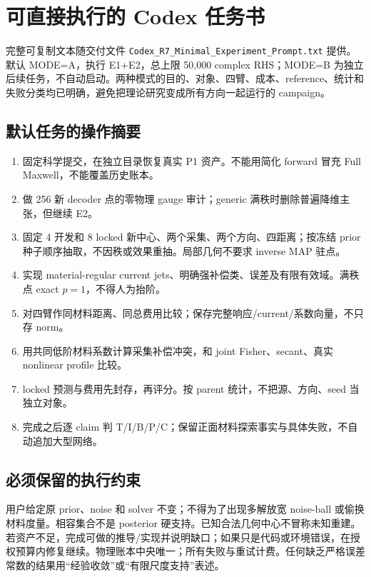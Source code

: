 \section{可直接执行的 Codex 任务书}
完整可复制文本随交付文件 \texttt{Codex\_R7\_Minimal\_Experiment\_Prompt.txt} 提供。默认 MODE=A，执行 E1+E2，总上限 50,000 complex RHS；MODE=B 为独立后续任务，不自动启动。两种模式的目的、对象、四臂、成本、reference、统计和失败分类均已明确，避免把理论研究变成所有方向一起运行的 campaign。

\subsection{默认任务的操作摘要}
\begin{enumerate}
\item 固定科学提交，在独立目录恢复真实 P1 资产。不能用简化 forward 冒充 Full Maxwell，不能覆盖历史账本。
\item 做 256 新 decoder 点的零物理 gauge 审计；generic 满秩时删除普遍降维主张，但继续 E2。
\item 固定 4 开发和 8 locked 新中心、两个采集、两个方向、四距离；按冻结 prior 种子顺序抽取，不因秩或效果重抽。局部几何不要求 inverse MAP 驻点。
\item 实现 material-regular current jets、明确强补偿类、误差及有限有效域。满秩点 exact $p=1$，不得人为抬阶。
\item 对四臂作同材料距离、同总费用比较；保存完整响应/current/系数向量，不只存 norm。
\item 用共同低阶材料系数计算采集补偿冲突，和 joint Fisher、secant、真实 nonlinear profile 比较。
\item locked 预测与费用先封存，再评分。按 parent 统计，不把源、方向、seed 当独立对象。
\item 完成之后逐 claim 判 T/I/B/P/C；保留正面材料探索事实与具体失败，不自动追加大型网络。
\end{enumerate}

\subsection{必须保留的执行约束}
用户给定原 prior、noise 和 solver 不变；不得为了出现多解放宽 noise-ball 或偷换材料度量。相容集合不是 posterior 硬支持。已知合法几何中心不冒称未知重建。若资产不足，完成可做的推导/实现并说明缺口；如果只是代码或环境错误，在授权预算内修复继续。物理账本中央唯一；所有失败与重试计费。任何缺乏严格误差常数的结果用“经验收敛”或“有限尺度支持”表述。

